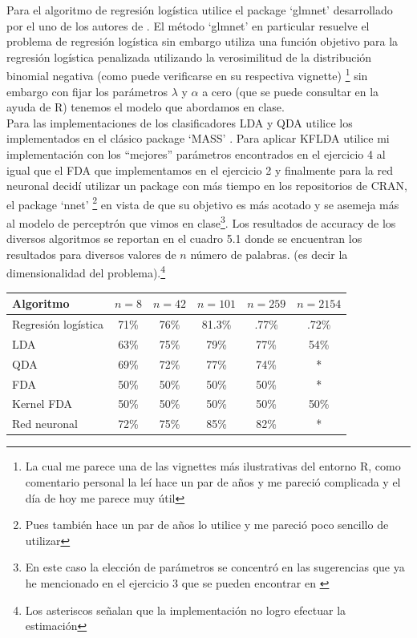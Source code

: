 \documentclass[paper=letter, fontsize=11pt]{scrartcl}
\numberwithin{equation}{section} %
\numberwithin{figure}{section} %
\numberwithin{table}{section} %
\begin{document}
\begin{enumerate}
Para el algoritmo de regresión logística utilice el package ‘glmnet’ desarrollado por el uno de los autores de \cite{Hes}. El método ‘glmnet’ en particular resuelve el problema de regresión logística sin embargo utiliza una función objetivo para la regresión logística penalizada utilizando la verosimilitud de la distribución binomial negativa (como puede verificarse en su respectiva vignette) \footnote{La cual me parece una de las vignettes más ilustrativas del entorno R, como comentario personal la leí hace un par de años y me pareció complicada y el día de hoy me parece muy útil} sin embargo con fijar los parámetros $\lambda $ y $\alpha$ a cero (que se puede consultar en la ayuda de R) tenemos el modelo que  abordamos en clase.\\ Para las implementaciones de los clasificadores LDA y QDA utilice los implementados en el clásico package ‘MASS’ . Para aplicar KFLDA utilice mi implementación con los “mejores” parámetros encontrados en el ejercicio 4 al igual que el FDA que implementamos en el ejercicio 2 y finalmente para la red neuronal decidí utilizar un package con más tiempo en los repositorios de CRAN, el package ‘nnet’ \footnote{Pues también hace un par de años lo utilice y me pareció poco sencillo de utilizar} en vista de que su objetivo es más acotado y se asemeja más al modelo de perceptrón que vimos en clase\footnote{En este caso la elección de parámetros se concentró en las sugerencias que ya he mencionado en el ejercicio 3 que se pueden encontrar en \cite{Hes}}. Los resultados de accuracy de los diversos algoritmos se reportan en el cuadro 5.1 donde se encuentran los resultados para diversos valores de $n$ número de palabras. (es decir la dimensionalidad del problema).\footnote{Los asteriscos señalan que la implementación no logro efectuar la estimación}\\  
\[\]
\begin{minipage}{\linewidth}
\centering
\begin{tabular}{|l|c|c|c|c|c|}\hline
Algoritmo           &  $n=8 $ & $n=42$ & $n=101$ & $n=259$ &  $n=2154$ \\ \hline
Regresión logística &71\% 	 &     76\%  &    81.3\% & .77\%     &.72\% \\
LDA                & 63\%	 &    75\%   & 79\%      & 77\%      &54\%\\
QDA 			  & 69\%	&     72\%   &  77\%     & 74\%     &*  \\
FDA 			 & 50\% 	&    50\%   & 50\%       & 50\%    &  *\\
Kernel FDA 		& 50\%	   &     50\%  &  50\%      &50\%    & 50\%\\
Red neuronal 	& 	72\%	&    75\%  & 85\%       &82\%  & *\\ \hline
\end {tabular}
\label{comparacion_PIMA} 
\end{minipage}



\end{enumerate}
\end{document}
